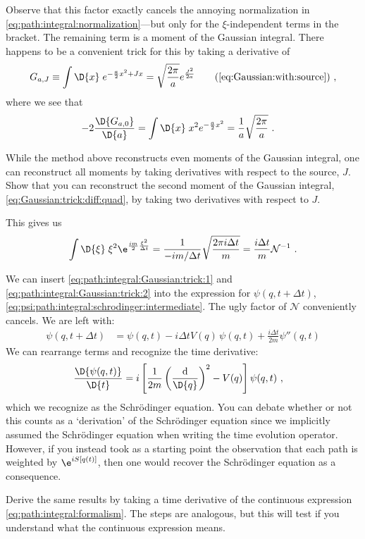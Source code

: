 Observe that this factor exactly cancels the annoying normalization in \eqref{eq:path:integral:normalization}---but only for the $\xi$-independent terms in the bracket. The remaining term is a moment of the Gaussian integral. There happens to be a convenient trick for this by taking a derivative of 
\begin{align}
    G_{a,J} \equiv \int \D{x}\; e^{-\frac{a}{2}x^2 + Jx} = \sqrt{\frac{2\pi}{a}}  e^{\frac{J^2}{2a}} 
    \tag{\ref{eq:Gaussian:with:source}} \ ,
\end{align}
where we see that
\begin{align}
    -2\frac{\D{G_{a,0}}}{\D{a}} &= \int \D{x}\; x^2 e^{-\frac{a}{2}x^2} 
    = \frac{1}{a}\sqrt{\frac{2\pi}{a}} \ .
    \label{eq:Gaussian:trick:diff:quad}
\end{align}
\begin{exercise}
While the method above reconstructs even moments of the Gaussian integral, one can reconstruct all moments by taking derivatives with respect to the source, $J$. Show that you can reconstruct the second moment of the Gaussian integral, \eqref{eq:Gaussian:trick:diff:quad}, by taking two derivatives with respect to $J$. 
\end{exercise}
This gives us 
\begin{align}
    \int \D{\xi}\; \xi^2
    \e^{\frac{im}{2}\frac{\xi^2}{\Delta t}} 
    = 
    \frac{1}{-im/\Delta t}
    \sqrt{\frac{2\pi i\Delta t}{m}} 
    =\frac{i\Delta t}{m} \mathcal{N}^{-1} \ .
    \label{eq:path:integral:Gaussian:trick:2}
\end{align}

We can insert \eqref{eq:path:integral:Gaussian:trick:1} and \eqref{eq:path:integral:Gaussian:trick:2} into the expression for $\psi(q,t+\Delta t)$, \eqref{eq:psi:path:integral:schrodinger:intermediate}. The ugly factor of $\mathcal N$ conveniently cancels. We are left with:
\begin{align}
    \psi(q,t+\Delta t) &= \psi(q,t) - i \Delta t V(q)\, \psi(q,t) + \frac{i\Delta t}{2m} \psi''(q,t)
\end{align}
We can rearrange terms and recognize the time derivative:
\begin{align}
    \frac{\D{\psi(q,t)}}{\D{t}}
    &= i\left[\frac{1}{2m}\left(\frac{\textnormal{d}}{\D{q}}\right)^2 - V(q)\right]\psi(q,t) \ ,
\end{align}
which we recognize as the Schr\"odinger equation. You can debate whether or not this counts as a `derivation' of the Schr\"odinger equation since we implicitly assumed the Schr\"odinger equation when writing the time evolution operator. However, if you instead took as a starting point the observation that each path is weighted by $\e^{iS[q(t)]}$, then one would recover the Schr\"odinger equation as a consequence. 








\begin{exercise}
Derive the same results by taking a time derivative of the continuous expression \eqref{eq:path:integral:formalism}. The steps are analogous, but this will test if you understand what the continuous expression means.
\end{exercise}

